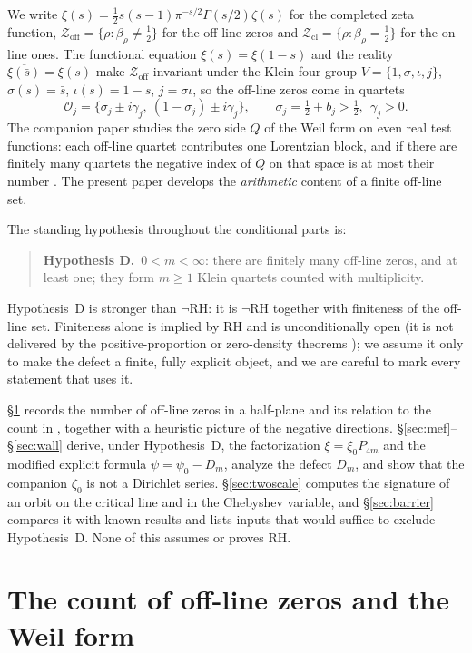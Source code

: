 \documentclass[11pt]{amsart}
\theoremstyle{definition}
\theoremstyle{remark}
\newcommand{\RH}{\mathrm{RH}}
\newcommand{\half}{\tfrac12}
\newcommand{\Zoff}{\mathcal Z_{\mathrm{off}}}
\newcommand{\Zcl}{\mathcal Z_{\mathrm{cl}}}
\begin{document}
We write $\xi(s)=\half s(s-1)\pi^{-s/2}\Gamma(s/2)\zeta(s)$ for the completed zeta function,
$\Zoff=\{\rho:\beta_\rho\ne\half\}$ for the off-line zeros and $\Zcl=\{\rho:\beta_\rho=\half\}$
for the on-line ones. The functional equation $\xi(s)=\xi(1-s)$ and the reality
$\overline{\xi(\bar s)}=\xi(s)$ make $\Zoff$ invariant under the Klein four-group
$V=\{1,\sigma,\iota,j\}$, $\sigma(s)=\bar s$, $\iota(s)=1-s$, $j=\sigma\iota$, so the off-line
zeros come in quartets
\[
\mathcal O_j=\{\sigma_j\pm i\gamma_j,\ (1-\sigma_j)\pm i\gamma_j\},\qquad
\sigma_j=\half+b_j>\half,\ \ \gamma_j>0 .
\]
The companion paper \cite{Index} studies the zero side $Q$ of the Weil form on even real test
functions: each off-line quartet contributes one Lorentzian block, and if there are finitely many
quartets the negative index of $Q$ on that space is at most their number
\cite[Thm.~3.1, Cor.~6.5]{Index}. The present paper develops the \emph{arithmetic} content of a
finite off-line set.

The standing hypothesis throughout the conditional parts is:

\begin{quote}
\textbf{Hypothesis D.}\ $0<m<\infty$: there are finitely many off-line zeros, and at least
one; they form $m\ge1$ Klein quartets counted with multiplicity.
\end{quote}

Hypothesis~D is stronger than $\neg\RH$: it is $\neg\RH$ together with finiteness of the
off-line set. Finiteness alone is implied by $\RH$ and is unconditionally open (it is not
delivered by the positive-proportion or zero-density theorems \cite[Prop.~7.3]{Index}); we assume it only to make the defect a finite, fully explicit object, and we
are careful to mark every statement that uses it.

\S\ref{sec:geometry} records the number of off-line zeros in a half-plane and its relation to
the count in \cite{Index}, together with a heuristic picture of the negative directions. \S\ref{sec:mef}--\S\ref{sec:wall} derive, under Hypothesis~D, the factorization
$\xi=\xi_0P_{4m}$ and the modified explicit formula $\psi=\psi_0-D_m$, analyze the defect
$D_m$, and show that the companion $\zeta_0$ is not a Dirichlet series. \S\ref{sec:twoscale}
computes the signature of an orbit on the critical line and in the Chebyshev variable, and
\S\ref{sec:barrier} compares it with known results and lists inputs that would suffice to
exclude Hypothesis~D. None of this assumes or proves $\RH$.

\section{The count of off-line zeros and the Weil form}\label{sec:geometry}
\end{document}
